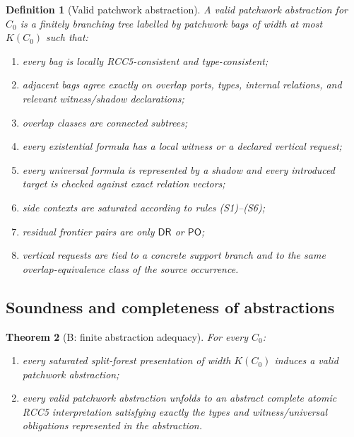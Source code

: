 \documentclass[11pt]{article}
\newtheorem{theorem}{Theorem}[section]
\newtheorem{definition}[theorem]{Definition}
\newcommand{\PO}{\mathsf{PO}}
\newcommand{\DR}{\mathsf{DR}}
\begin{document}
\begin{definition}[Valid patchwork abstraction]\label{def:valid}
A valid patchwork abstraction for $C_0$ is a finitely branching tree labelled by patchwork bags of width at most $K(C_0)$ such that:
\begin{enumerate}[label=(V\arabic*)]
\item every bag is locally RCC5-consistent and type-consistent;
\item adjacent bags agree exactly on overlap ports, types, internal relations, and relevant witness/shadow declarations;
\item overlap classes are connected subtrees;
\item every existential formula has a local witness or a declared vertical request;
\item every universal formula is represented by a shadow and every introduced target is checked against exact relation vectors;
\item side contexts are saturated according to rules (S1)--(S6);
\item residual frontier pairs are only $\DR$ or $\PO$;
\item vertical requests are tied to a concrete support branch and to the same overlap-equivalence class of the source occurrence.
\end{enumerate}
\end{definition}

\subsection{Soundness and completeness of abstractions}

\begin{theorem}[B: finite abstraction adequacy]\label{thm:B}
For every $C_0$:
\begin{enumerate}[label=(\alph*)]
\item every saturated split-forest presentation of width $K(C_0)$ induces a valid patchwork abstraction;
\item every valid patchwork abstraction unfolds to an abstract complete atomic RCC5 interpretation satisfying exactly the types and witness/universal obligations represented in the abstraction.
\end{enumerate}
\end{theorem}
\end{document}
